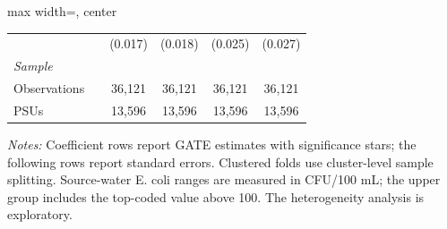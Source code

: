 \begin{landscape}
\begin{table}[p]
\begin{adjustbox}{max width=\linewidth, center}
\begin{tabular}{llcccc}
 &  & (0.017) & (0.018) & (0.025) & (0.027) \\
\multicolumn{6}{l}{\textit{Sample}} \\
\quad Observations &  & 36,121 & 36,121 & 36,121 & 36,121 \\
\quad PSUs &  & 13,596 & 13,596 & 13,596 & 13,596 \\
\bottomrule
\end{tabular}
\end{adjustbox}
\par\vspace{3pt}
\begin{minipage}{\linewidth}\footnotesize \textit{Notes:} Coefficient rows report GATE estimates with significance stars; the following rows report standard errors. Clustered folds use cluster-level sample splitting. Source-water E. coli ranges are measured in CFU/100 mL; the upper group includes the top-coded value above 100. The heterogeneity analysis is exploratory.\end{minipage}
\end{table}
\end{landscape}